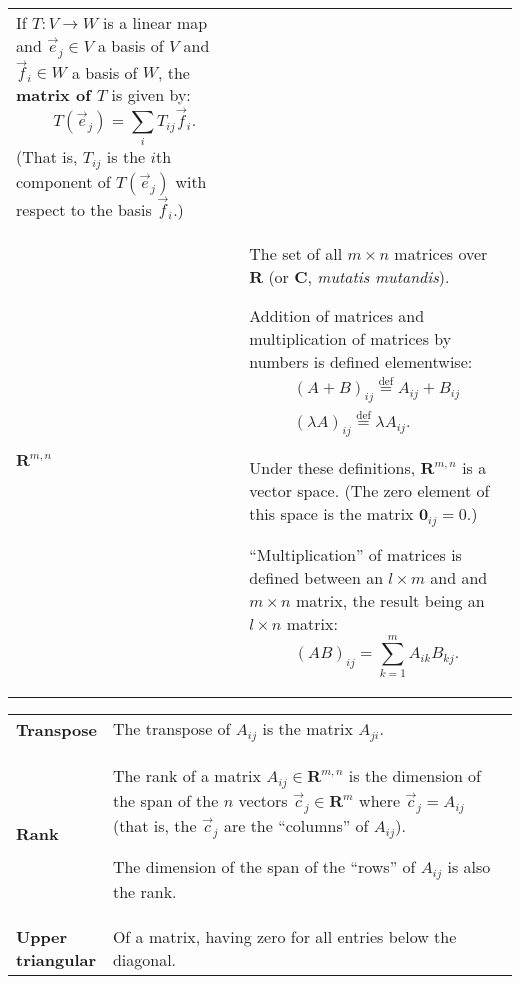 \documentclass[10pt, a4paper, landscape]{article}
\newcommand{\defn}[1]{\textbf{#1}}
\newcommand{\isdef}{\stackrel{\text{def}}{=}}
\newcommand{\set}[1]{\mathbold{#1}}
\newlength{\termheaderwd}
\begin{document}
\begin{multicols*}{3}
\begin{tabularx}{\columnwidth}{@{}l>{\raggedright\arraybackslash}X@{}}
  If $T\colon V\to W$ is a linear map and $\vec{e}_j\in V$ a basis of $V$ and $\vec{f}_i\in W$ a basis of $W$, the \defn{matrix of $T$} is given by:
  \begin{equation*}
    T(\vec{e}_j) = \sum_i T_{ij} \vec{f}_i.
  \end{equation*}
  (That is, $T_{ij}$ is the $i$th component of $T(\vec{e}_j)$ with respect to the basis $\vec{f}_i$.)
  \\
  
  $\set{R}^{m,n}$ & The set of all $m\times n$ matrices over $\set{R}$ (or $\set{C}$, \emph{mutatis mutandis}).

  Addition of matrices and multiplication of matrices by numbers is
  defined elementwise:
  \begin{equation*}
    \begin{gathered}
      (A+B)_{ij} \isdef A_{ij} + B_{ij} \\
      (\lambda A)_{ij} \isdef \lambda A_{ij}.
    \end{gathered}
  \end{equation*}

  Under these definitions, $\set{R}^{m,n}$ is a vector space. (The zero element of this space is the matrix $\mathbold{0}_{ij} = 0$.)
  
  “Multiplication” of matrices is defined between an $l\times m$ and and $m \times n$ matrix, the result being an $l\times n$ matrix:
  \begin{equation*}
    (AB)_{ij} = \sum_{k=1}^m A_{ik}B_{kj}.
  \end{equation*}
  \\
\end{tabularx}

\begin{tabularx}{\columnwidth}{@{}l>{\raggedright\arraybackslash}X@{}}

  \defn{Transpose} & The transpose of $A_{ij}$ is the matrix $A_{ji}$.
  \\

  \defn{Rank} & The rank of a matrix $A_{ij}\in\set{R}^{m,n}$ is the dimension of the span of the $n$ vectors $\vec{c}_j\in \set{R}^m$ where $\vec{c}_j = A_{ij}$ (that is, the $\vec{c}_j$ are the ``columns'' of $A_{ij}$).

  The dimension of the span of the ``rows'' of $A_{ij}$ is also the rank.
  \\

  \parbox[t]{\termheaderwd}{\defn{Upper\\ triangular}} & Of a matrix, having zero for all entries below the diagonal. \\


\end{tabularx}
\end{multicols*}
\end{document}
